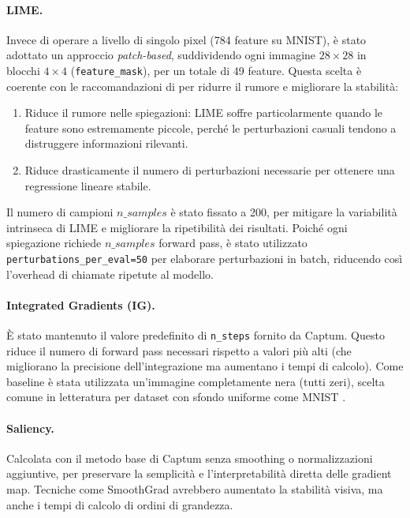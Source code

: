 \documentclass{article}
\begin{document}
\paragraph{LIME.}
Invece di operare a livello di singolo pixel (784 feature su MNIST), è stato
adottato un approccio \textit{patch-based}, suddividendo ogni immagine
$28\times28$ in blocchi $4\times4$ (\texttt{feature\_mask}), per un totale di
49 feature. Questa scelta è coerente con le raccomandazioni di
\citet{ribeiro2016lime} per ridurre il rumore e migliorare la stabilità:
\begin{enumerate}
      \item Riduce il rumore nelle spiegazioni: LIME soffre particolarmente quando le
            feature sono estremamente piccole, perché le perturbazioni casuali tendono a
            distruggere informazioni rilevanti.
      \item Riduce drasticamente il numero di perturbazioni necessarie per ottenere una
            regressione lineare stabile.
\end{enumerate}
Il numero di campioni $n\_samples$ è stato fissato a 200, per mitigare la variabilità intrinseca di LIME e migliorare la ripetibilità dei risultati.
Poiché ogni spiegazione richiede $n\_samples$ forward pass, è stato utilizzato \texttt{perturbations\_per\_eval=50} per elaborare perturbazioni in batch, riducendo così l’overhead di chiamate ripetute al modello.

\paragraph{Integrated Gradients (IG).}
È stato mantenuto il valore predefinito di \texttt{n\_steps} fornito da Captum.
Questo riduce il numero di forward pass necessari rispetto a valori più alti (che migliorano la precisione dell’integrazione ma aumentano i tempi di calcolo).
Come baseline è stata utilizzata un’immagine completamente nera (tutti zeri), scelta comune in letteratura per dataset con sfondo uniforme come MNIST \citep{sundararajan2017axiomatic}.

\paragraph{Saliency.}
Calcolata con il metodo base di Captum senza smoothing o normalizzazioni
aggiuntive, per preservare la semplicità e l’interpretabilità diretta delle
gradient map. Tecniche come SmoothGrad \citep{smilkov2017smoothgrad} avrebbero
aumentato la stabilità visiva, ma anche i tempi di calcolo di ordini di
grandezza.
\end{document}

